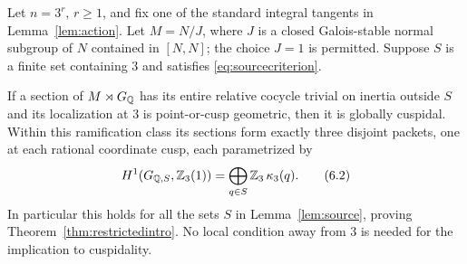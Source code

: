 \begin{theorem}\label{thm:restricted3}
Let $n=3^r$, $r\geq1$, and fix one of the standard integral
tangents in Lemma~\ref{lem:action}. Let $M=N/J$, where $J$ is a
closed Galois-stable normal subgroup of $N$ contained in $[N,N]$;
the choice $J=1$ is permitted. Suppose $S$ is a finite set
containing $3$ and satisfies \eqref{eq:sourcecriterion}.

If a section of $M\rtimes G_\mathbb Q$ has its entire relative cocycle
trivial on inertia outside $S$ and its localization at $3$ is
point-or-cusp geometric, then it is globally cuspidal.
Within this ramification class its sections form exactly three
disjoint packets, one at each rational coordinate cusp, each
parametrized by
\[
 H^1(G_{\mathbb Q,S},\mathbb Z_3(1))
    =\bigoplus_{q\in S}\mathbb Z_3\,\kappa_3(q).
 \tag{6.2}\label{eq:restrictedpackets}
\]
In particular this holds for all the sets $S$ in
Lemma~\ref{lem:source}, proving Theorem~\ref{thm:restrictedintro}.
No local condition away from $3$ is needed
for the implication to cuspidality.
\end{theorem}
